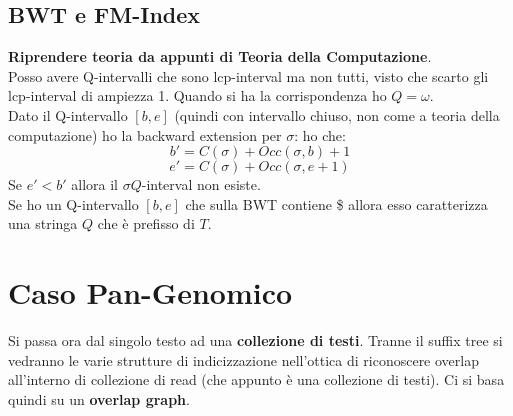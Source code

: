 \documentclass[a4paper,12pt, oneside]{book}
\begin{document}
\subsection{BWT e FM-Index}
\textbf{Riprendere teoria da appunti di Teoria della Computazione}.\\
Posso avere Q-intervalli che sono lcp-interval ma non tutti, visto che scarto
gli lcp-interval di ampiezza 1. Quando si ha la corrispondenza ho $Q=\omega$.\\
Dato il Q-intervallo $[b,e]$ (quindi con intervallo chiuso, non come a teoria
della computazione) ho la backward extension per $\sigma$:
ho che:
\[b'=C(\sigma)+Occ(\sigma,b)+1\]
\[e'=C(\sigma)+Occ(\sigma,e+1)\]
Se $e'<b'$ allora il $\sigma Q$-interval non esiste.\\
Se ho un Q-intervallo $[b,e]$ che sulla BWT contiene \$ allora esso caratterizza
una stringa $Q$ che è prefisso di $T$.
\section{Caso Pan-Genomico}
Si passa ora dal singolo testo ad una \textbf{collezione di testi}. Tranne il
suffix tree si vedranno le varie strutture di indicizzazione nell'ottica di
riconoscere overlap all'interno di collezione di read (che appunto è una
collezione di testi). Ci si basa quindi su un \textbf{overlap graph}.
\end{document}
